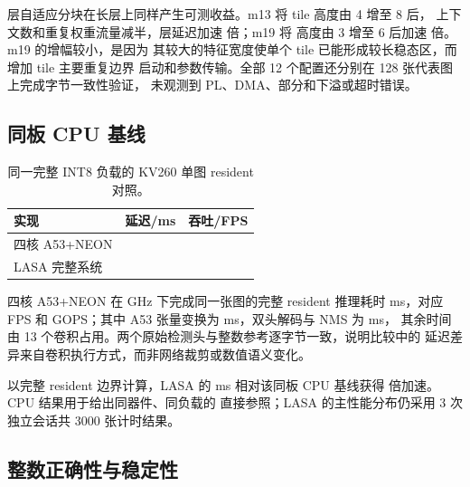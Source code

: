 层自适应分块在长层上同样产生可测收益。m13 将 tile 高度由 4 增至 8 后，
上下文数和重复权重流量减半，层延迟加速 \AblMThirteenSpeedup{} 倍；m19 将
高度由 3 增至 6 后加速 \AblMNineteenSpeedup{} 倍。m19 的增幅较小，是因为
其较大的特征宽度使单个 tile 已能形成较长稳态区，而增加 tile 主要重复边界
启动和参数传输。全部 12 个配置还分别在 128 张代表图上完成字节一致性验证，
未观测到 PL、DMA、部分和下溢或超时错误。

\subsection{同板 CPU 基线}

\begin{table}[t]
\centering
\caption{同一完整 INT8 负载的 KV260 单图 resident 对照。}
\label{tab:cpu-baseline}
\small
\setlength{\tabcolsep}{4.0pt}
\begin{tabular}{lrr}
\toprule
实现 & 延迟/ms & 吞吐/FPS \\
\midrule
四核 A53+NEON & \CPUFourCoreLatencyMs{} & \CPUFourCoreFPS{} \\
LASA 完整系统 & \ResidentMeanMs{} & \ResidentFPS{} \\
\bottomrule
\end{tabular}
\end{table}

四核 A53+NEON 在 \CPUFourCoreClockGHz{} GHz 下完成同一张图的完整 resident
推理耗时 \CPUFourCoreLatencyMs{} ms，对应 \CPUFourCoreFPS{} FPS 和
\CPUFourCoreEffectiveGOPS{} GOPS；其中 A53 张量变换为
\CPUFourCoreTensorMs{} ms，双头解码与 NMS 为 \CPUFourCoreDecodeMs{} ms，
其余时间由 13 个卷积占用。两个原始检测头与整数参考逐字节一致，说明比较中的
延迟差异来自卷积执行方式，而非网络裁剪或数值语义变化。

以完整 resident 边界计算，LASA 的 \ResidentMeanMs{} ms 相对该同板 CPU
基线获得 \CPUFourCoreSpeedup{} 倍加速。CPU 结果用于给出同器件、同负载的
直接参照；LASA 的主性能分布仍采用 3 次独立会话共 3000 张计时结果。

\subsection{整数正确性与稳定性}

